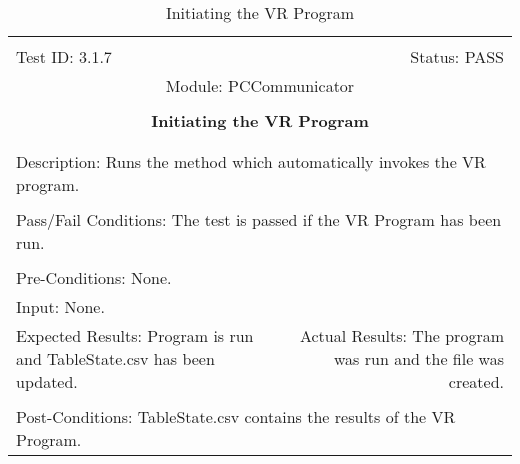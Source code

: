 \documentclass[titlepage]{article}
\begin{document}
\begin{center}
\begin{table}[h!]
\begin{tabular}{|l r|}\hline&\\[-2mm]
	Test ID: 3.1.7	&Status: PASS\\[-3mm]
	\multicolumn{2}{|c|}{Module: PCCommunicator}\\&\\
	\multicolumn{2}{|c|}{\textbf{\large{Initiating the VR Program}}}\\&\\\hline&\\[-3mm]
	\multicolumn{2}{|p{\textwidth}|}{Description: Runs the method which automatically invokes the VR program.}\\[1mm]\hline&\\[-3mm]
	\multicolumn{2}{|p{\textwidth}|}{Pass/Fail Conditions: The test is passed if the VR Program has been run.}\\[1mm]\hline&\\[-3mm]
	\multicolumn{2}{|p{\textwidth}|}{Pre-Conditions: None.}\\[4mm]
	\multicolumn{2}{|p{\textwidth}|}{Input: None.}\\[2mm]\hline
	\multicolumn{1}{|p{0.49\textwidth}}{Expected Results: Program is run and TableState.csv has been updated.}	&\multicolumn{1}{|p{0.45\textwidth}|}{Actual Results: The program was run and the file was created.}\\\hline&\\[-3mm]
	\multicolumn{2}{|p{\textwidth}|}{Post-Conditions: TableState.csv contains the results of the VR Program.}\\\hline
\end{tabular}
\caption{Initiating the VR Program}
\end{table}
\end{center}
\newpage
\end{document}
